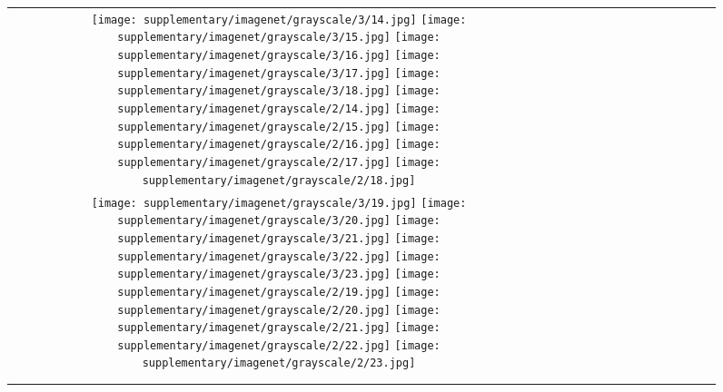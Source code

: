 \begin{figure*}[tb!]
{\begin{tabular}{c c c c c c c c c c c c c c }
\tabularnewline
  \texttt{[image: supplementary/imagenet/grayscale/3/14.jpg]}
  \texttt{[image: supplementary/imagenet/grayscale/3/15.jpg]}
  \texttt{[image: supplementary/imagenet/grayscale/3/16.jpg]}
  \texttt{[image: supplementary/imagenet/grayscale/3/17.jpg]}
  \texttt{[image: supplementary/imagenet/grayscale/3/18.jpg]}
    \hspace{5mm}
  \texttt{[image: supplementary/imagenet/grayscale/2/14.jpg]}
  \texttt{[image: supplementary/imagenet/grayscale/2/15.jpg]}
  \texttt{[image: supplementary/imagenet/grayscale/2/16.jpg]}
  \texttt{[image: supplementary/imagenet/grayscale/2/17.jpg]}
  \texttt{[image: supplementary/imagenet/grayscale/2/18.jpg]}

\tabularnewline
  \texttt{[image: supplementary/imagenet/grayscale/3/19.jpg]}
  \texttt{[image: supplementary/imagenet/grayscale/3/20.jpg]}
  \texttt{[image: supplementary/imagenet/grayscale/3/21.jpg]}
  \texttt{[image: supplementary/imagenet/grayscale/3/22.jpg]}
  \texttt{[image: supplementary/imagenet/grayscale/3/23.jpg]}
    \hspace{5mm}
  \texttt{[image: supplementary/imagenet/grayscale/2/19.jpg]}
  \texttt{[image: supplementary/imagenet/grayscale/2/20.jpg]}
  \texttt{[image: supplementary/imagenet/grayscale/2/21.jpg]}
  \texttt{[image: supplementary/imagenet/grayscale/2/22.jpg]}
  \texttt{[image: supplementary/imagenet/grayscale/2/23.jpg]}
    \tabularnewline

 \hspace{0.5mm}
  \tabularnewline
\vspace{2mm}
\vspace{-2\baselineskip}
\end{tabular}}
\vspace{-0.8cm}
\hspace{20pt}\label{fig:sup1b}
\vspace{-8mm}
\end{figure*}%